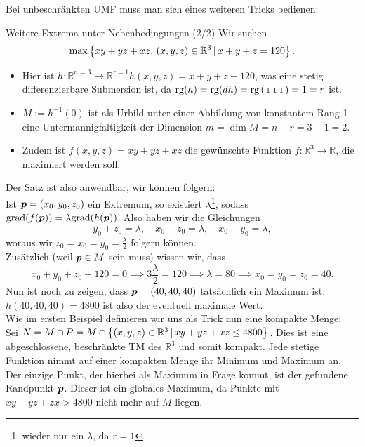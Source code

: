 Bei unbeschränkten UMF muss man sich eines weiteren Tricks bedienen:
\begin{Beispiel}
{Weitere Extrema unter Nebenbedingungen (2/2)}
Wir suchen
\begin{equation*}
    \max\left\{xy+yz+xz,\, (x,y,z)\in\mathbb{R}^3\,|\, x+y+z=120\right\}.
\end{equation*}
\begin{itemize}
    \item Hier ist $h:\mathbb{R}^{n=3}\to\mathbb{R}^{r=1}h(x,y,z)=x+y+z-120$, was eine stetig differenzierbare Submersion ist, da $\text{rg}(h)=\text{rg}(dh)=\text{rg}\left(\begin{smallmatrix}1&1&1\end{smallmatrix}\right)=1=r$ ist.
    \item $M:=h^{-1}(0)$ ist als Urbild unter einer Abbildung von konstantem Rang 1 eine Untermannigfaltigkeit der Dimension $m=\dim M=n-r=3-1=2$.
    \item Zudem ist $f(x,y,z)=xy+yz+xz$ die gewünschte Funktion $f:\mathbb{R}^3\to\mathbb{R}$, die maximiert werden soll.
\end{itemize}
Der Satz ist also anwendbar, wir können folgern:\\
Ist ${{\text{\boldmath${p}$}}}=(x_0,y_0,z_0)$ ein Extremum, so existiert $\lambda$\footnote{wieder nur ein $\lambda$, da $r=1$}, sodass $\text{grad}(f({{\text{\boldmath${p}$}}}))=\lambda\text{grad}(h({{\text{\boldmath${p}$}}}))$. Also haben wir die Gleichungen
\begin{equation*}
    y_0+z_0=\lambda,\quad x_0+z_0=\lambda,\quad x_0+y_0=\lambda,
\end{equation*}
woraus wir $z_0=x_0=y_0=\frac{\lambda}{2}$ folgern können.\\
Zusätzlich (weil ${{\text{\boldmath${p}$}}}\in M$ sein muss) wissen wir, dass
\begin{equation*}
    x_0+y_0+z_0-120=0\implies 3\frac{\lambda}{2}=120\implies \lambda=80\implies x_0=y_0=z_0=40.
\end{equation*}
Nun ist noch zu zeigen, dass ${{\text{\boldmath${p}$}}}=(40,40,40)$ tatsächlich ein Maximum ist:\\
$h(40,40,40)=4800$ ist also der eventuell maximale Wert.\\
Wie im ersten Beispiel definieren wir uns als Trick nun eine kompakte Menge:\\
Sei $N=M\cap P=M\cap\left\{(x,y,z)\in\mathbb{R}^3\,|\, xy+yz+xz\leq4800\right\}$. Dies ist eine abgeschlossene, beschränkte TM des $\mathbb{R}^3$ und somit kompakt. Jede stetige Funktion nimmt auf einer kompakten Menge ihr Minimum und Maximum an.\\
Der einzige Punkt, der hierbei als Maximum in Frage kommt, ist der gefundene Randpunkt ${{\text{\boldmath${p}$}}}$. Dieser ist ein globales Maximum, da Punkte mit $xy+yz+zx>4800$ nicht mehr auf $M$ liegen.
\end{Beispiel}